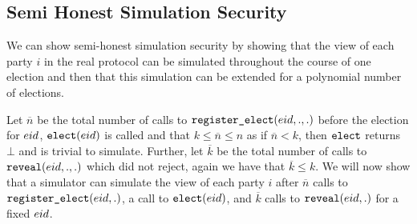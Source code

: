 \subsection{Semi Honest Simulation Security}


We can show semi-honest simulation security by showing that the view of each party $i$ in the real protocol
can be simulated throughout the course of one election and then that this simulation can be extended for a polynomial number of elections.

\newcommand{\totalReg}{\overline{n}}
\newcommand{\totalRev}{\overline{k}}
Let $\totalReg$ be the total number of calls to $\texttt{register\_elect}({eid}, ., .)$ before the election for ${eid}$, $\texttt{elect}({eid})$
is called and that $k \leq \totalReg \leq n$ as if $\totalReg < k$, then $\texttt{elect}$ returns $\bot$ and is trivial to simulate.
Further, let $\totalRev$ be the total number of calls to $\texttt{reveal}({eid}, ., .)$ which did not reject, again we have that $\totalRev \leq k$.
We will now show that a simulator can simulate the view of each party $i$ after $\totalReg$ calls to $\texttt{register\_elect}({eid}, .)$, a call to $\texttt{elect}({eid})$, and $\totalRev$ calls to $\texttt{reveal}({eid}, .)$
for a fixed ${eid}$.

\newcommand{\simIMSLE}{\texttt{Sim}_i}


